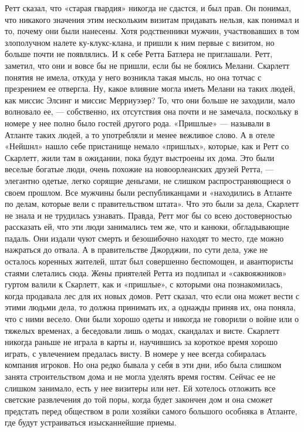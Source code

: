 Ретт сказал, что «старая гвардия» никогда не сдастся, и был прав. Он понимал, что никакого значения этим нескольким визитам придавать нельзя, как понимал и то, почему они были нанесены. Хотя родственники мужчин, участвовавших в том злополучном налете ку-клукс-клана, и пришли к ним первые с визитом, но больше почти не появлялись. И к себе Ретта Батлера не приглашали.
Ретт, заметил, что они и вовсе бы не пришли, если бы не боялись Мелани. Скарлетт понятия не имела, откуда у него возникла такая мысль, но она тотчас с презрением ее отвергла. Ну, какое влияние могла иметь Мелани на таких людей, как миссис Элсинг и миссис Мерриуэзер? То, что они больше не заходили, мало волновало ее, — собственно, их отсутствия она почти и не замечала, поскольку в номере у нее полно было гостей другого рода. «Пришлые» — называли в Атланте таких людей, а то употребляли и менее вежливое слово.
А в отеле «Нейшнл» нашло себе пристанище немало «пришлых», которые, как и Ретт со Скарлетт, жили там в ожидании, пока будут выстроены их дома. Это были веселые богатые люди, очень похожие на новоорлеанских друзей Ретта, — элегантно одетые, легко сорящие деньгами, не слишком распространяющиеся о своем прошлом. Все мужчины были республиканцами и «находились в Атланте по делам, которые вели с правительством штата». Что это были за дела, Скарлетт не знала и не трудилась узнавать.
Правда, Ретт мог бы со всею достоверностью рассказать ей, что эти люди занимались тем же, что и канюки, обгладывающие падаль. Они издали чуют смерть и безошибочно находят то место, где можно нажраться до отвала. А в правительстве Джорджии, по сути дела, уже не осталось коренных жителей, штат был совершенно беспомощен, и авантюристы стаями слетались сюда.
Жены приятелей Ретта из подлипал и «саквояжников» гуртом валили к Скарлетт, как и «пришлые», с которыми она познакомилась, когда продавала лес для их новых домов. Ретт сказал, что если она может вести с этими людьми дела, то должна принимать их, а однажды приняв их, она поняла, что с ними весело. Они были хорошо одеты и никогда не говорили о войне или о тяжелых временах, а беседовали лишь о модах, скандалах и висте. Скарлетт никогда раньше не играла в карты и, научившись за короткое время хорошо играть, с увлечением предалась висту.
В номере у нее всегда собиралась компания игроков. Но она редко бывала у себя в эти дни, ибо была слишком занята строительством дома и не могла уделять время гостям. Сейчас ее не слишком занимало, есть у нее визитеры или нет. Ей хотелось отложить все светские развлечения до той поры, когда будет закончен дом и она сможет предстать перед обществом в роли хозяйки самого большого особняка в Атланте, где будут устраиваться изысканнейшие приемы.
